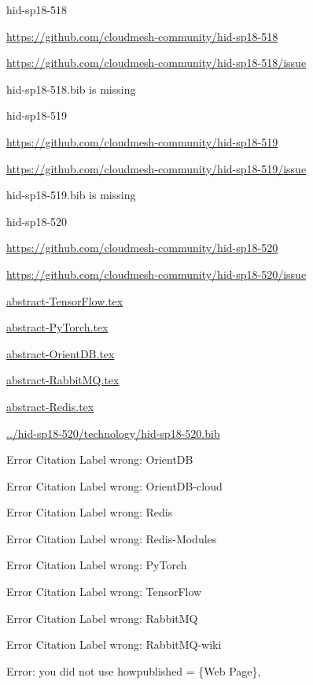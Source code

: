 \begin{IU}

hid-sp18-518

\url{https://github.com/cloudmesh-community/hid-sp18-518}

\url{https://github.com/cloudmesh-community/hid-sp18-518/issue}

hid-sp18-518.bib is missing

\end{IU}


\begin{IU}

hid-sp18-519

\url{https://github.com/cloudmesh-community/hid-sp18-519}

\url{https://github.com/cloudmesh-community/hid-sp18-519/issue}

hid-sp18-519.bib is missing

\end{IU}


\begin{IU}

hid-sp18-520

\url{https://github.com/cloudmesh-community/hid-sp18-520}

\url{https://github.com/cloudmesh-community/hid-sp18-520/issue}

\href{https://github.com/cloudmesh-community/hid-sp18-520/blob/master//technology/abstract-TensorFlow.tex}{abstract-TensorFlow.tex}

\href{https://github.com/cloudmesh-community/hid-sp18-520/blob/master//technology/abstract-PyTorch.tex}{abstract-PyTorch.tex}

\href{https://github.com/cloudmesh-community/hid-sp18-520/blob/master//technology/abstract-OrientDB.tex}{abstract-OrientDB.tex}

\href{https://github.com/cloudmesh-community/hid-sp18-520/blob/master//technology/abstract-RabbitMQ.tex}{abstract-RabbitMQ.tex}

\href{https://github.com/cloudmesh-community/hid-sp18-520/blob/master//technology/abstract-Redis.tex}{abstract-Redis.tex}

\href{https://github.com/cloudmesh-community/hid-sp18-520/blob/master//technology/hid-sp18-520.bib}{../hid-sp18-520/technology/hid-sp18-520.bib}

 Error Citation Label wrong: OrientDB

 Error Citation Label wrong: OrientDB-cloud

 Error Citation Label wrong: Redis

 Error Citation Label wrong: Redis-Modules

 Error Citation Label wrong:  PyTorch

 Error Citation Label wrong: TensorFlow

 Error Citation Label wrong: RabbitMQ

 Error Citation Label wrong: RabbitMQ-wiki

Error: you did not use howpublished = \{Web Page\},

\end{IU}


